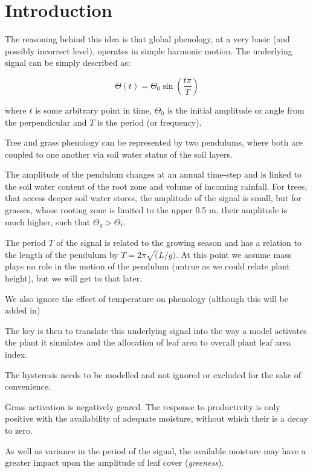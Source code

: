 \section{Introduction}
The reasoning behind this idea is that global phenology, at a very basic (and
possibly incorrect level), operates in simple harmonic motion. The underlying
signal can be simply described as:

\begin{equation}
    \Theta(t) = \Theta_0 \sin\left(\frac{t\pi}{T}\right)
\end{equation}

where $t$ is some arbitrary point in time, $\Theta_0$ is the initial amplitude
or angle from the perpendicular and $T$ is the period (or frequency).

\begin{center}
\end{center}

Tree and grass phenology can be represented by two pendulums, where both are
coupled to one another via soil water status of the soil layers. 

The amplitude of the pendulum changes at an annual time-step and is linked to
the soil water content of the root zone and volume of incoming rainfall. For
trees, that access deeper soil water stores, the amplitude of the signal is
small, but for grasses, whose rooting zone is limited to the upper 0.5 m, their
amplitude is much higher, such that $\Theta_g > \Theta_t$.

The period $T$ of the signal is related to the growing season and has a
relation to the length of the pendulum by $T=2\pi\sqrt(L/g)$. At this point we
assume mass plays no role in the motion of the pendulum (untrue as we could
relate plant height), but we will get to that later.

We also ignore the effect of temperature on phenology (although this will be
added in)

The key is then to translate this underlying signal into the way a model
activates the plant it simulates and the allocation of leaf area to overall
plant leaf area index.

The hysteresis needs to be modelled and not ignored or excluded for the sake of
convenience.

Grass activation is negatively geared. The response to productivity is only
positive with the availability of adequate moisture, without which their is a
decay to zero.

As well as variance in the period of the signal, the available moisture may
have a greater impact upon the amplitude of leaf cover (\emph{greeness}).
